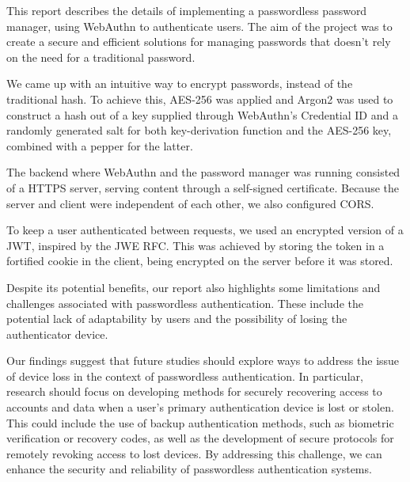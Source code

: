 This report describes the details of implementing a passwordless password
manager, using WebAuthn to authenticate users.
The aim of the project was to create a secure and efficient solutions for
managing passwords that doesn't rely on the need for a traditional password.

We came up with an intuitive way to encrypt passwords, instead of the
traditional hash.
To achieve this, AES-256 was applied and Argon2 was used to construct a hash out
of a key supplied through WebAuthn's Credential ID and a randomly generated
salt for both key-derivation function and the AES-256 key, combined with a
pepper for the latter.

The backend where WebAuthn and the password manager was running consisted of a
HTTPS server, serving content through a self-signed certificate.
Because the server and client were independent of each other, we also
configured CORS\@.

To keep a user authenticated between requests, we used an encrypted version
of a JWT, inspired by the JWE RFC\@.
This was achieved by storing the token in a fortified cookie in the client,
being encrypted on the server before it was stored.

Despite its potential benefits, our report also highlights some limitations
and challenges associated with passwordless authentication.
These include the potential lack of adaptability by users and the
possibility of losing the authenticator device.

Our findings suggest that future studies should explore ways to address the
issue of device loss in the context of passwordless authentication.
In particular, research should focus on developing methods for securely
recovering access to accounts and data when a user’s primary authentication
device is lost or stolen.
This could include the use of backup authentication methods, such as biometric
verification or recovery codes, as well as the development of secure protocols
for remotely revoking access to lost devices.
By addressing this challenge, we can enhance the security and reliability of
passwordless authentication systems.
